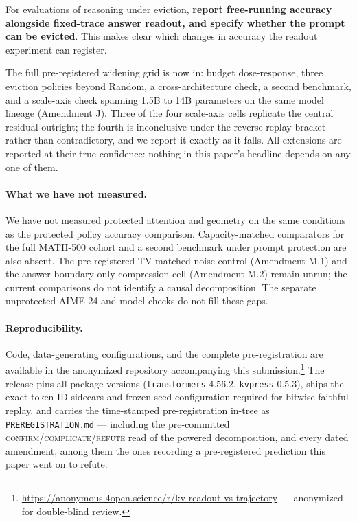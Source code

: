 \documentclass{article}
\begin{document}
For evaluations of reasoning under eviction, \textbf{report free-running accuracy alongside fixed-trace answer readout, and specify whether the prompt can be evicted}. This makes clear which changes in accuracy the readout experiment can register.

The full pre-registered widening grid is now in: budget dose-response, three eviction policies beyond Random, a cross-architecture check, a second benchmark, and a scale-axis check spanning 1.5B to 14B parameters on the same model lineage (Amendment J). Three of the four scale-axis cells replicate the central residual outright; the fourth is inconclusive under the reverse-replay bracket rather than contradictory, and we report it exactly as it falls. All extensions are reported at their true confidence: nothing in this paper's headline depends on any one of them.

\paragraph{What we have not measured.} We have not measured protected attention and geometry on the same conditions as the protected policy accuracy comparison. Capacity-matched comparators for the full MATH-500 cohort and a second benchmark under prompt protection are also absent. The pre-registered TV-matched noise control (Amendment M.1) and the answer-boundary-only compression cell (Amendment M.2) remain unrun; the current comparisons do not identify a causal decomposition. The separate unprotected AIME-24 and model checks do not fill these gaps.

\paragraph{Reproducibility.} Code, data-generating configurations, and the complete pre-registration are available in the anonymized repository accompanying this submission.\footnote{\url{https://anonymous.4open.science/r/kv-readout-vs-trajectory} --- anonymized for double-blind review.} The release pins all package versions (\texttt{transformers} 4.56.2, \texttt{kvpress} 0.5.3), ships the exact-token-ID sidecars and frozen seed configuration required for bitwise-faithful replay, and carries the time-stamped pre-registration in-tree as \texttt{PREREGISTRATION.md} --- including the pre-committed \textsc{confirm}/\textsc{complicate}/\textsc{refute} read of the powered decomposition, and every dated amendment, among them the ones recording a pre-registered prediction this paper went on to refute.
\end{document}
